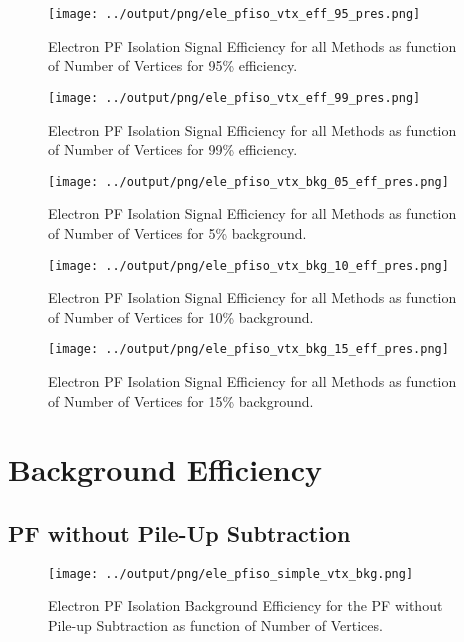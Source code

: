 \documentclass[11pt]{book}
\begin{document}
\begin{figure}[htb]
\centering
\texttt{[image: ../output/png/ele\_pfiso\_vtx\_eff\_95\_pres.png]}
\caption{Electron PF Isolation Signal Efficiency for all Methods as function of Number of Vertices for 95\% efficiency.}
\label{fig:ele_pfiso_vtx_eff_95_pres}
\end{figure}

\begin{figure}[htb]
\centering
\texttt{[image: ../output/png/ele\_pfiso\_vtx\_eff\_99\_pres.png]}
\caption{Electron PF Isolation Signal Efficiency for all Methods as function of Number of Vertices for 99\% efficiency.}
\label{fig:ele_pfiso_vtx_eff_99_pres}
\end{figure}

\begin{figure}[htb]
\centering
\texttt{[image: ../output/png/ele\_pfiso\_vtx\_bkg\_05\_eff\_pres.png]}
\caption{Electron PF Isolation Signal Efficiency for all Methods as function of Number of Vertices for 5\% background.}
\label{fig:ele_pfiso_vtx_bkg_05_eff_pres}
\end{figure}

\begin{figure}[htb]
\centering
\texttt{[image: ../output/png/ele\_pfiso\_vtx\_bkg\_10\_eff\_pres.png]}
\caption{Electron PF Isolation Signal Efficiency for all Methods as function of Number of Vertices for 10\% background.}
\label{fig:ele_pfiso_vtx_bkg_10_eff_pres}
\end{figure}

\begin{figure}[htb]
\centering
\texttt{[image: ../output/png/ele\_pfiso\_vtx\_bkg\_15\_eff\_pres.png]}
\caption{Electron PF Isolation Signal Efficiency for all Methods as function of Number of Vertices for 15\% background.}
\label{fig:ele_pfiso_vtx_bkg_15_eff_pres}
\end{figure}
\clearpage

\chapter{Background Efficiency}
\section{PF without Pile-Up Subtraction}
\begin{figure}[htb]
\centering
\texttt{[image: ../output/png/ele\_pfiso\_simple\_vtx\_bkg.png]}
\caption{Electron PF Isolation Background Efficiency for the PF without Pile-up Subtraction as function of Number of Vertices.}
\label{fig:ele_pfiso_vtx_bkg_simple}
\end{figure}
\end{document}
